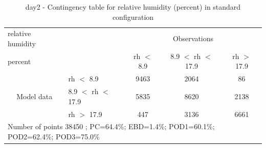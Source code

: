 \begin{table}[p!]
\begin{center}
\begin{tabular}{llccc}
\hline
{relative humidity}                                       &                                                    & \multicolumn{3}{c}{Observations}                 \\
{percent}                                       &                             & rh $<$ 8.9   & 8.9 $<$ rh $<$ 17.9 & rh $>$ 17.9 \\
\hline
\multicolumn{1}{c}{\multirow{3}{*}{Model data}}  & rh $<$ 8.9             & 9463                & 2064                       & 86              \\
                                                 & 8.9  $<$ rh $<$ 17.9 & 5835                & 8620                       & 2138              \\
                                                 & rh $>$ 17.9             & 447                & 3136                       & 6661              \\
\hline
\multicolumn{5}{l}{ Number of points        38450 ; PC=64.4\%; EBD=1.4\%; POD1=60.1\%; POD2=62.4\%; POD3=75.0\%}
\end{tabular}
\end{center}
\caption{day2 - Contingency table for  relative humidity (percent) in standard configuration}
\label{tab:contingencyrhBEF:day2}
\end{table}
